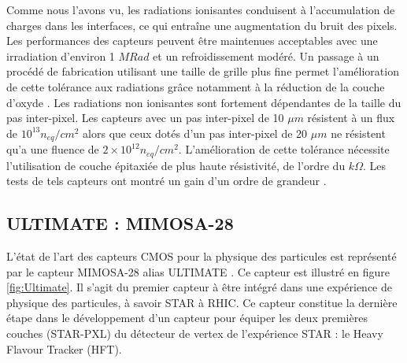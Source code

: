    Comme nous l'avons vu, les radiations ionisantes conduisent \`a l'accumulation de charges dans les interfaces, ce qui entraîne une augmentation du bruit des pixels. Les performances des capteurs peuvent \^etre maintenues acceptables avec une irradiation d'environ 1 $MRad$ et un refroidissement mod\'er\'e. Un passage \`a un proc\'ed\'e de fabrication utilisant une taille de grille plus fine permet l'am\'elioration de cette tol\'erance aux radiations grâce notamment \`a la r\'eduction de la couche d'oxyde \cite{Deveaux:2011}. Les radiations non ionisantes sont fortement d\'ependantes de la taille du pas inter-pixel. Les capteurs avec un pas inter-pixel de 10 $\mu m$ r\'esistent \`a un flux de $10^{13} n_{eq}/cm^2$ alors que ceux dot\'es d'un pas inter-pixel de 20 $\mu m$ ne r\'esistent qu'a une fluence de $2 \times 10^{12} n_{eq}/cm^2$. L'am\'elioration de cette tol\'erance n\'ecessite l'utilisation de couche \'epitaxi\'ee de plus haute r\'esistivit\'e, de l'ordre du $k \Omega$. Les tests de tels capteurs ont montr\'e un gain d'un ordre de grandeur \cite{Dorokhov2010432}.
   

  \FloatBarrier
   
   \subsection{ULTIMATE : MIMOSA-28}
   \label{sub:MIMOSA28}
   
   L'\'etat de l'art des capteurs CMOS pour la physique des particules est repr\'esent\'e par le capteur MIMOSA-28 alias ULTIMATE \cite{1748-0221-7-01-C01102}. Ce capteur est illustr\'e en figure \ref{fig:Ultimate}. Il s'agit du premier capteur \`a \^etre int\'egr\'e dans une exp\'erience de physique des particules, \`a savoir STAR \`a RHIC. Ce capteur constitue la derni\`ere \'etape dans le développement d'un capteur pour \'equiper les deux premi\`eres couches (STAR-PXL) du d\'etecteur de vertex de l'exp\'erience STAR : le Heavy Flavour Tracker (HFT).

